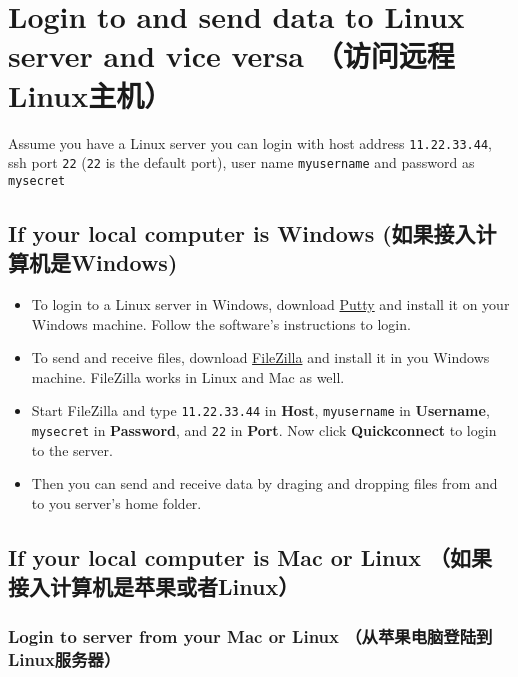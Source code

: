 \documentclass{article}
\begin{document}
    \section{Login to and send data to Linux server and vice versa
（访问远程Linux主机）}\label{login-to-and-send-data-to-linux-server-and-vice-versa-ux8bbfux95eeux8fdcux7a0blinuxux4e3bux673a}

Assume you have a Linux server you can login with host address
\texttt{11.22.33.44}, ssh port \texttt{22} (\texttt{22} is the default
port), user name \texttt{myusername} and password as \texttt{mysecret}

\subsection{If your local computer is Windows
(如果接入计算机是Windows)}\label{if-your-local-computer-is-windows-ux5982ux679cux63a5ux5165ux8ba1ux7b97ux673aux662fwindows}

\begin{itemize}
\item
  To login to a Linux server in Windows, download
  \href{http://www.chiark.greenend.org.uk/~sgtatham/putty/download.html}{Putty}
  and install it on your Windows machine. Follow the software's
  instructions to login.
\item
  To send and receive files, download
  \href{https://filezilla-project.org/}{FileZilla} and install it in you
  Windows machine. FileZilla works in Linux and Mac as well.
\item
  Start FileZilla and type \texttt{11.22.33.44} in \textbf{Host},
  \texttt{myusername} in \textbf{Username}, \texttt{mysecret} in
  \textbf{Password}, and \texttt{22} in \textbf{Port}. Now click
  \textbf{Quickconnect} to login to the server.
\item
  Then you can send and receive data by draging and dropping files from
  and to you server's home folder.
\end{itemize}

\subsection{If your local computer is Mac or Linux
（如果接入计算机是苹果或者Linux）}\label{if-your-local-computer-is-mac-or-linux-ux5982ux679cux63a5ux5165ux8ba1ux7b97ux673aux662fux82f9ux679cux6216ux8005linux}

\subsubsection{Login to server from your Mac or Linux
（从苹果电脑登陆到Linux服务器）}\label{login-to-server-from-your-mac-or-linux-ux4eceux82f9ux679cux7535ux8111ux767bux9646ux5230linuxux670dux52a1ux5668}
\end{document}
